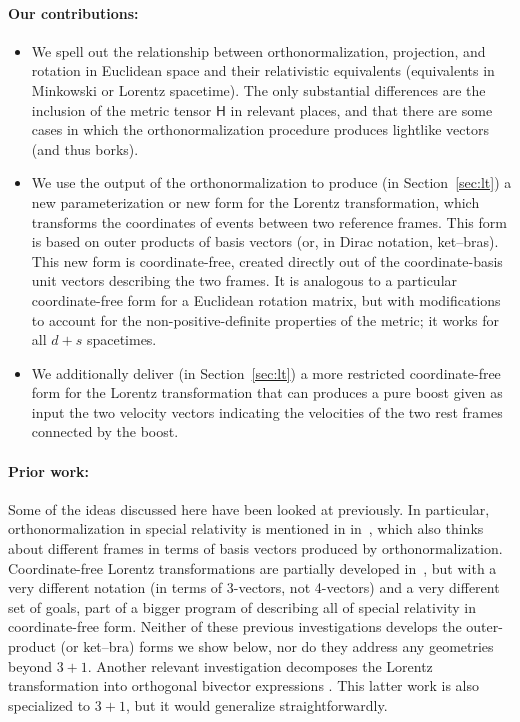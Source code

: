 \documentclass{article}
\newcommand{\metric}{\mathsf{H}}
\newcommand{\plus}{\!+\!} %
\newcommand{\secref}[1]{Section~\ref{#1}}
\begin{document}
\paragraph{Our contributions:}
\begin{itemize}
\item
We spell out the relationship between orthonormalization, projection, and rotation in Euclidean space and their relativistic equivalents (equivalents in Minkowski or Lorentz spacetime).
The only substantial differences are the inclusion of the metric tensor $\metric$ in relevant places, and that there are some cases in which the orthonormalization procedure produces lightlike vectors (and thus borks).
\item
We use the output of the orthonormalization to produce (in \secref{sec:lt}) a new parameterization or new form for the Lorentz transformation, which transforms the coordinates of events between two reference frames.
This form is based on outer products of basis vectors (or, in Dirac notation, ket--bras).
This new form is coordinate-free, created directly out of the coordinate-basis unit vectors describing the two frames.
It is analogous to a particular coordinate-free form for a Euclidean rotation matrix, but with modifications to account for the non-positive-definite properties of the metric; it works for all $d\plus s$ spacetimes.
\item
We additionally deliver (in \secref{sec:lt}) a more restricted coordinate-free form for the Lorentz transformation that can produces a pure boost given as input the two velocity vectors indicating the velocities of the two rest frames connected by the boost.
\end{itemize}

\paragraph{Prior work:}
Some of the ideas discussed here have been looked at previously.
In particular, orthonormalization in special relativity is mentioned in in~\cite{joot}, which also thinks about different frames in terms of basis vectors produced by orthonormalization.
Coordinate-free Lorentz transformations are partially developed in~\cite{wagner}, but with a very different notation (in terms of 3-vectors, not 4-vectors) and a very different set of goals, part of a bigger program of describing all of special relativity in coordinate-free form.
Neither of these previous investigations develops the outer-product (or ket--bra) forms we show below, nor do they address any geometries beyond $3\plus 1$.
Another relevant investigation decomposes the Lorentz transformation into orthogonal bivector expressions \cite{hanson}.
This latter work is also specialized to $3+1$, but it would generalize straightforwardly.
\end{document}
